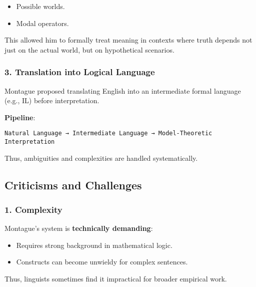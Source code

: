 \documentclass[12pt]{article}
\newcommand{\tightlist}{\itemsep 0pt\parskip 0pt\parsep 0pt}
\begin{document}
\begin{itemize}
\tightlist
\item
  Possible worlds.
\item
  Modal operators.
\end{itemize}

This allowed him to formally treat meaning in contexts where truth
depends not just on the actual world, but on hypothetical scenarios.

\hypertarget{translation-into-logical-language}{%
\subsubsection{\texorpdfstring{3. \textbf{Translation into Logical
Language}}{3. Translation into Logical Language}}\label{translation-into-logical-language}}

Montague proposed translating English into an intermediate formal
language (e.g., IL) before interpretation.

\textbf{Pipeline}:

\begin{verbatim}
Natural Language → Intermediate Language → Model-Theoretic Interpretation
\end{verbatim}

Thus, ambiguities and complexities are handled systematically.

\hypertarget{criticisms-and-challenges-1}{%
\subsection{Criticisms and
Challenges}\label{criticisms-and-challenges-1}}

\hypertarget{complexity}{%
\subsubsection{\texorpdfstring{1.
\textbf{Complexity}}{1. Complexity}}\label{complexity}}

Montague's system is \textbf{technically demanding}:

\begin{itemize}
\tightlist
\item
  Requires strong background in mathematical logic.
\item
  Constructs can become unwieldy for complex sentences.
\end{itemize}

Thus, linguists sometimes find it impractical for broader empirical
work.
\end{document}
